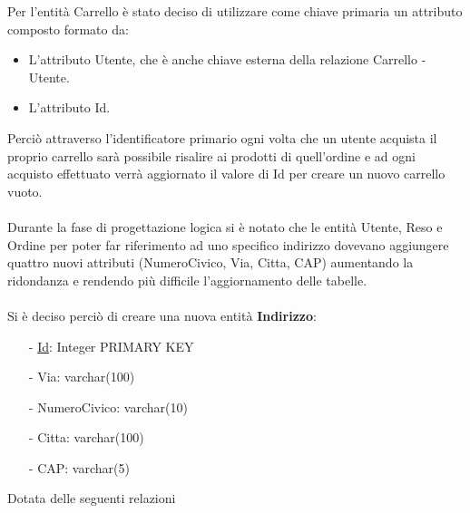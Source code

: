 \documentclass[10pt]{article}
\begin{document}
Per l'entità Carrello è stato deciso di utilizzare come chiave primaria un attributo composto formato da:
\begin{itemize}
    \itemsep0em 
    \item L'attributo Utente, che è anche chiave esterna della relazione Carrello - Utente.
    \item L'attributo Id.
\end{itemize}
Perciò attraverso l'identificatore primario ogni volta che un utente acquista il proprio carrello sarà
possibile risalire ai prodotti di quell'ordine e ad ogni acquisto effettuato verrà aggiornato il valore di Id per 
creare un nuovo carrello vuoto.\\\\
Durante la fase di progettazione logica si è notato che le entità Utente, Reso e Ordine per poter far riferimento 
ad uno specifico indirizzo dovevano aggiungere quattro nuovi attributi (NumeroCivico, Via, Citta, CAP) aumentando
la ridondanza e rendendo più difficile l'aggiornamento delle tabelle.\\\\
Si è deciso perciò di creare una nuova entità \textbf{Indirizzo}:
\begin{itemize}
    \itemsep0em 
    \item[-] \underline{Id}: Integer PRIMARY KEY
    \item[-] Via: varchar(100)
    \item[-] NumeroCivico: varchar(10)
    \item[-] Citta: varchar(100)
    \item[-] CAP: varchar(5)
\end{itemize}
Dotata delle seguenti relazioni
\end{document}

